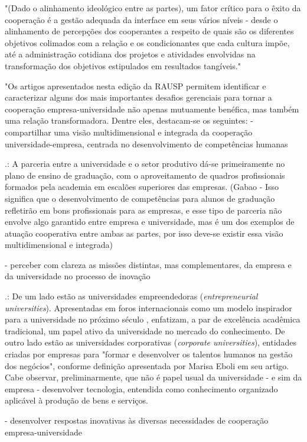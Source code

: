 "(Dado o alinhamento ideológico entre as partes), um fator crítico para o êxito da cooperação é a gestão adequada da interface em seus vários níveis - desde o alinhamento de percepções dos cooperantes a respeito de quais são os diferentes objetivos colimados com a relação e os condicionantes que cada cultura impõe, até a administração cotidiana dos projetos e atividades envolvidas na transformação dos objetivos estipulados em resultados tangíveis."

"Os artigos apresentados nesta edição da RAUSP permitem identificar e caracterizar alguns dos mais importantes desafios gerenciais para tornar a cooperação empresa-universidade não apenas mutuamente benéfica, mas também uma relação transformadora. Dentre eles, destacam-se os seguintes: 
- compartilhar uma visão multidimensional e integrada da cooperação universidade-empresa, centrada no desenvolvimento de competências humanas

.: A parceria entre a universidade e o setor produtivo dá-se primeiramente no plano de ensino de graduação, com o aproveitamento de quadros profissionais formados pela academia em escalões superiores das empresas. (Gabao - Isso significa que o desenvolvimento de competências para alunos de graduação refletirão em bons profissionais para as empresas, e esse tipo de parceria não envolve algo garantido entre empresa e universidade, mas é um dos exemplos de atuação cooperativa entre ambas as partes, por isso deve-se existir essa visão multidimensional e integrada)

- perceber com clareza as missões distintas, mas complementares, da empresa e da universidade no processo de inovação

.: De um lado estão as universidades empreendedoras (\textit{entrepreneurial universities}). Apresentadas em foros internacionais como um modelo inspirador para a universidade no próximo século	, enfatizam, a par de excelência acadêmica tradicional, um papel ativo da universidade no mercado do conhecimento. De outro lado estão as universidades corporativas (\textit{corporate universities}), entidades criadas por empresas para "formar e desenvolver os talentos humanos na gestão dos negócios", conforme definição apresentada por Marisa Eboli em seu artigo.  Cabe observar, preliminarmente, que não é papel usual da universidade - e sim da empresa - desenvolver tecnologia, entendida como conhecimento organizado aplicável à produção de bens e serviços.

- desenvolver respostas inovativas às diversas necessidades de cooperação empresa-universidade

